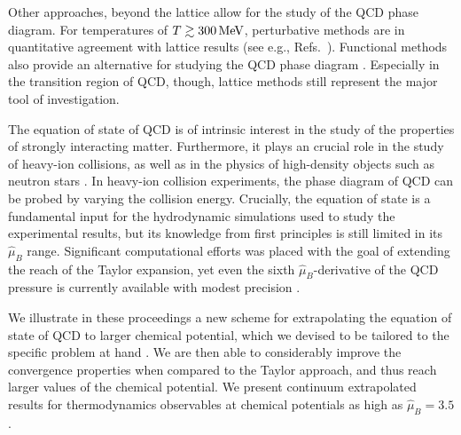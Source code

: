 \documentclass[a4paper,11pt]{article}
\newcommand{\MeV}{\, {\rm MeV}}
\newcommand \hmu {\hat{\mu}}
\begin{document}
Other approaches, beyond the lattice allow for the study of the QCD phase diagram. For 
temperatures of $T \gtrsim 300\MeV$, perturbative methods are in quantitative 
agreement with lattice results (see e.g., Refs.~\cite{Bellwied:2015lba,Haque:2020eyj}). 
Functional methods also provide an alternative for studying the QCD phase diagram 
\cite{Dupuis:2020fhh}. Especially in the transition region of QCD, though, lattice 
methods still represent the major tool of investigation.

The equation of state of QCD is of intrinsic interest in the study of the properties of 
strongly interacting matter. Furthermore, it plays an crucial role in the study of heavy-ion 
collisions, as well as in the physics of high-density objects such as neutron stars 
\cite{Dexheimer:2020zzs}. 
In heavy-ion collision experiments, the phase diagram of QCD can be probed by varying 
the collision energy. Crucially, the equation of state is a fundamental input for the 
hydrodynamic simulations used to study the experimental results, but its knowledge 
from first principles is still limited in its $\hmu_B$ range. Significant computational 
efforts was placed with the goal of extending the reach of the Taylor expansion, yet even 
the sixth $\hmu_B$-derivative of the QCD pressure is currently available with modest 
precision \cite{Borsanyi:2018grb,Bazavov:2020bjn}.  

We illustrate in these proceedings a new  scheme for extrapolating the equation of state 
of QCD to larger chemical potential, which we devised to be tailored to the specific 
problem at hand \cite{Borsanyi:2021sxv}.  We are then able to considerably improve 
the convergence properties when compared to the Taylor approach, and thus reach 
larger values of the chemical potential. We present continuum extrapolated results
for thermodynamics observables at chemical potentials as high as  $\hmu_B = 3.5$.
\end{document}
